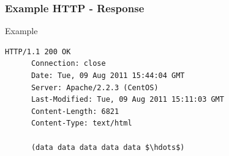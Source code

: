 \documentclass[9pt]{beamer}
\begin{document}
\begin{frame}[fragile]
\frametitle<presentation>{Example HTTP - Response}
  \begin{exampleblock}{Example}
    \begin{lstlisting}[mathescape, captionpos=b,caption={Simple HTTP response message. Taken from \cite{kurose}},label=lst:httpResponse] 
      HTTP/1.1 200 OK
      Connection: close
      Date: Tue, 09 Aug 2011 15:44:04 GMT
      Server: Apache/2.2.3 (CentOS)
      Last-Modified: Tue, 09 Aug 2011 15:11:03 GMT
      Content-Length: 6821
      Content-Type: text/html

      (data data data data data $\hdots$)
    \end{lstlisting}
  \end{exampleblock}

\end{frame}
\end{document}

